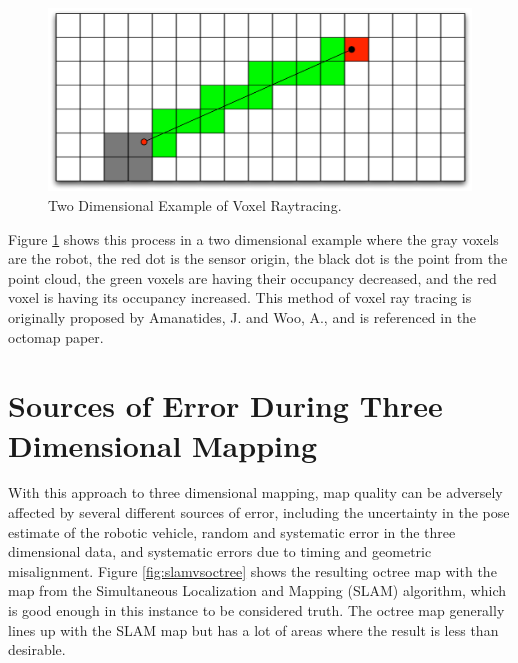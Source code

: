 \documentclass[12pt]{report}
\begin{document}
\begin{figure}[ht]
  \centering
  \includegraphics[width=5in,keepaspectratio]{raytrace.pdf}
  \caption{Two Dimensional Example of Voxel Raytracing.}
  \label{fig:voxel_raytrace}
\end{figure}

Figure \ref{fig:voxel_raytrace} shows this process in a two dimensional example where the gray voxels are the robot, the red dot is the sensor origin, the black dot is the point from the point cloud, the green voxels are having their occupancy decreased, and the red voxel is having its occupancy increased. This method of voxel ray tracing is originally proposed by Amanatides, J. and Woo, A., and is referenced in the octomap paper.\cite{amanatides1987fast}

\section{Sources of Error During Three Dimensional Mapping}
With this approach to three dimensional mapping, map quality can be adversely affected by several different sources of error, including the uncertainty in the pose estimate of the robotic vehicle, random and systematic error in the three dimensional data, and systematic errors due to timing and geometric misalignment.  Figure \ref{fig:slamvsoctree} shows the resulting octree map with the map from the Simultaneous Localization and Mapping (SLAM) algorithm, which is good enough in this instance to be considered truth. The octree map generally lines up with the SLAM map but has a lot of areas where the result is less than desirable.
\end{document}

